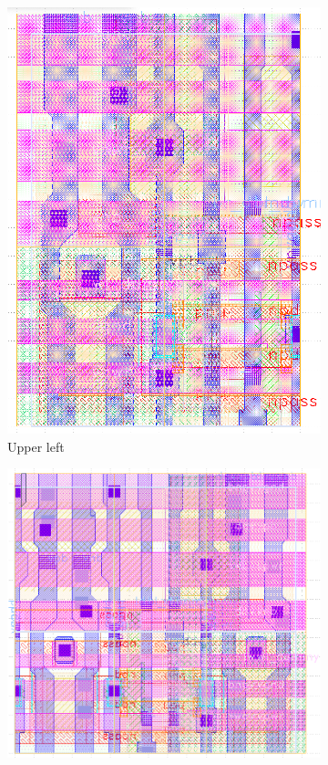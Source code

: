 \begin{figure}[H] \centering
\begin{subfigure}[b]{0.22\textwidth} \centering
\includegraphics[width=\textwidth]{figures/bitcell_ul.png}
\caption{Upper left}
\end{subfigure}
\hfill
\begin{subfigure}[b]{0.22\textwidth} \centering
\includegraphics[width=\textwidth]{figures/bitcell_ur.png}

\end{subfigure}
\end{figure}
